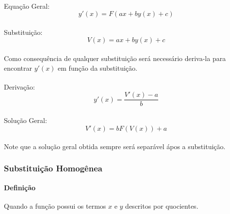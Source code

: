 \documentclass{article}
\begin{document}
                \paragraph{}Equação Geral:
                    \begin{equation}
                        y'(x)=F(ax+by(x)+c)
                    \end{equation}
                \paragraph{}Substituição:
                    \begin{equation}
                        V(x)=ax+by(x)+c
                    \end{equation}
                \paragraph{}Como consequência de qualquer substituição será necessário deriva-la para encontrar $y'(x)$ em função da substituição.
                \paragraph{}Derivação:
                    \begin{equation}
                        y'(x)=\frac{V'(x)-a}{b}
                    \end{equation}
                \paragraph{}Solução Geral:
                    \begin{equation}
                        V'(x)=bF(V(x))+a
                    \end{equation}
                \paragraph{}Note que a solução geral obtida sempre será separável ápos a substituição.

            \subsubsection{Substituição Homogênea}
                \paragraph{Definição}Quando a função possui os termos $x$ e $y$ descritos por quocientes.
\end{document}
